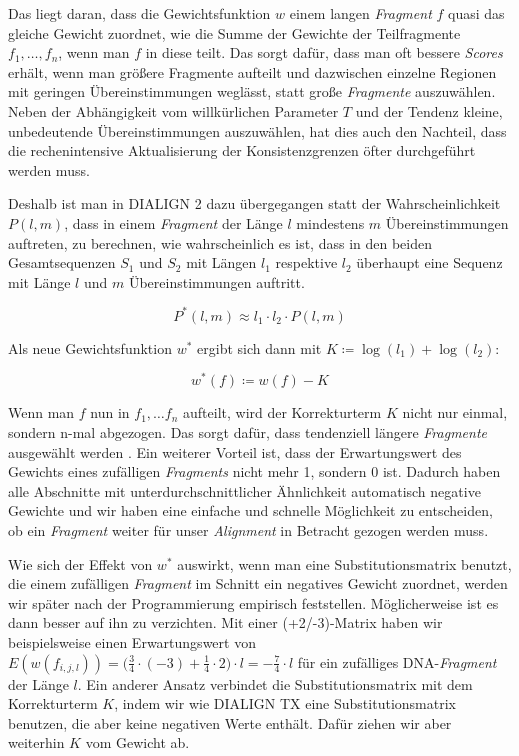 Das liegt daran, dass die Gewichtsfunktion $w$ einem langen \emph{Fragment} $f$ quasi das gleiche Gewicht zuordnet, wie die Summe der Gewichte der Teilfragmente $f_1, \dots, f_n$, wenn man $f$ in diese teilt. Das sorgt dafür, dass man oft bessere \emph{Scores} erhält, wenn man größere Fragmente aufteilt und dazwischen einzelne Regionen mit geringen Übereinstimmungen weglässt, statt große \emph{Fragmente} auszuwählen. Neben der Abhängigkeit vom willkürlichen Parameter $T$ und der Tendenz kleine, unbedeutende Übereinstimmungen auszuwählen, hat dies auch den Nachteil, dass die rechenintensive Aktualisierung der Konsistenzgrenzen öfter durchgeführt werden muss. 

Deshalb ist man in DIALIGN 2 dazu übergegangen statt der Wahrscheinlichkeit $P(l,m)$, dass in einem \emph{Fragment} der Länge $l$ mindestens $m$ Übereinstimmungen auftreten, zu berechnen, wie wahrscheinlich es ist, dass in den beiden Gesamtsequenzen $S_1$ und $S_2$ mit Längen $l_1$ respektive $l_2$ überhaupt eine Sequenz mit Länge $l$ und $m$ Übereinstimmungen auftritt. 

\begin{equation}
	P^*(l,m) \approx l_1\cdot l_2\cdot P(l,m)
\end{equation}

Als neue Gewichtsfunktion $w^*$ ergibt sich dann mit $K \coloneqq \log(l_1) + \log(l_2)$:

\begin{equation}
	w^*(f) \coloneqq w(f) - K
\end{equation}

Wenn man $f$ nun in $f_1, \dots f_n$ aufteilt, wird der Korrekturterm $K$ nicht nur einmal, sondern n-mal abgezogen. Das sorgt dafür, dass tendenziell längere \emph{Fragmente} ausgewählt werden \citep{m99}. Ein weiterer Vorteil ist, dass der Erwartungswert des Gewichts eines zufälligen \emph{Fragments} nicht mehr 1, sondern 0 ist. Dadurch haben alle Abschnitte mit unterdurchschnittlicher Ähnlichkeit automatisch negative Gewichte und wir haben eine einfache und schnelle Möglichkeit zu entscheiden, ob ein \emph{Fragment} weiter für unser \emph{Alignment} in Betracht gezogen werden muss.

Wie sich der Effekt von $w^*$ auswirkt, wenn man eine Substitutionsmatrix benutzt, die einem zufälligen \emph{Fragment} im Schnitt ein negatives Gewicht zuordnet, werden wir später nach der Programmierung empirisch feststellen. Möglicherweise ist es dann besser auf ihn zu verzichten. Mit einer (+2/-3)-Matrix haben wir beispielsweise einen Erwartungswert von $E(w(f_{i,j,l})) = \big( \frac{3}{4}\cdot(-3) + \frac{1}{4}\cdot2 \big) \cdot l = -\frac{7}{4}\cdot l$ für ein zufälliges DNA-\emph{Fragment} der Länge $l$. Ein anderer Ansatz verbindet die Substitutionsmatrix mit dem Korrekturterm $K$, indem wir wie DIALIGN TX eine Substitutionsmatrix benutzen, die aber keine negativen Werte enthält. Dafür ziehen wir aber weiterhin $K$ vom Gewicht ab.
 
